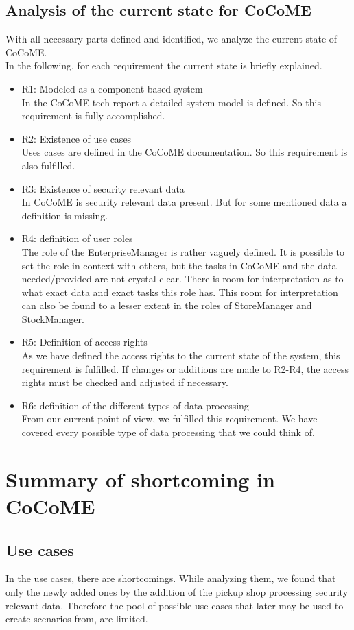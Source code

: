 \subsection{Analysis of the current state for CoCoME}
With all necessary parts defined and identified, we analyze the current state of CoCoME.\\
In the following, for each requirement the current state is briefly explained.
\begin{itemize}
\item R1: Modeled as a component based system \\ In the CoCoME tech report a detailed system model is defined. So this requirement is fully accomplished.
\item R2: Existence of use cases \\ Uses cases are defined in the CoCoME documentation. So this requirement is also fulfilled.
\item R3: Existence of security relevant data \\ In CoCoME is security relevant data present. But for some mentioned data a definition is missing.
\item R4: definition of user roles \\ The role of the EnterpriseManager is rather vaguely defined. It is possible to set the role in context with others, but the tasks in CoCoME and the data needed/provided are not crystal clear.  There is room for interpretation as to what exact data and exact tasks this role has. This room for interpretation can also be found to a lesser extent in the roles of StoreManager and StockManager. 
\item R5: Definition of access rights \\ As we have defined the access rights to the current state of the system, this requirement is fulfilled.  If changes or additions are made to R2-R4, the access rights must be checked and adjusted if necessary.
\item R6: definition of the different types of data processing \\ From our current point of view, we fulfilled this requirement. We have covered every possible type of data processing that we could think of.
\end{itemize}
\section{Summary of shortcoming in CoCoME}
\label{shortcommingsCoCoME}
\subsection{Use cases}
In the use cases, there are shortcomings. While analyzing them, we found that only the newly added ones by the addition of the pickup shop processing security relevant data. Therefore the pool of possible use cases that later may be used to create scenarios from, are limited. 
